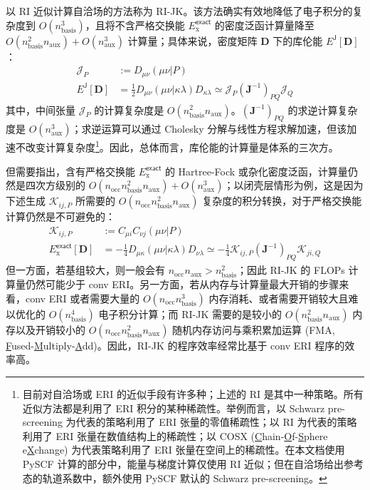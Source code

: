 以 RI 近似计算自洽场的方法称为 RI-JK。该方法确实有效地降低了电子积分的复杂度到 $O(n_\mathrm{basis}^3)$，且将不含严格交换能 $E_\mathrm{x}^\textsf{exact}$ 的密度泛函计算量降至 $O(n_\mathrm{basis}^2 n_\mathrm{aux}) + O(n_\mathrm{aux}^3)$ 计算量；具体来说，密度矩阵 $\mathbf{D}$ 下的库伦能 $E^\textsf{J} [\mathbf{D}]$：
\begin{align*}
  \mathcal{J}_P &:= D_{\mu \nu} (\mu \nu | P) \\
  E^\textsf{J} [\mathbf{D}] &= \frac{1}{2} D_{\mu \nu} (\mu \nu | \kappa \lambda) D_{\kappa \lambda} \simeq \mathcal{J}_P (\mathbf{J}^{-1})_{PQ} \mathcal{J}_Q
\end{align*}
其中，中间张量 $\mathcal{J}_P$ 的计算复杂度是 $O(n_\mathrm{basis}^2 n_\mathrm{aux})$。$(\mathbf{J}^{-1})_{PQ}$ 的求逆计算复杂度是 $O(n_\mathrm{aux}^3)$；求逆运算可以通过 Cholesky 分解与线性方程求解加速，但该加速不改变计算复杂度\footnote{目前对自洽场或 ERI 的近似手段有许多种；上述的 RI 是其中一种策略。所有近似方法都是利用了 ERI 积分的某种稀疏性。举例而言，以 Schwarz pre-screening 为代表的策略利用了 ERI 张量的零值稀疏性\cite{Horn-Ahlrichs.JCC.1991}；以 RI 为代表的策略利用了 ERI 张量在数值结构上的稀疏性\cite{Vahtras-Feyereisen.CPL.1993}；以 COSX (\underline{C}hain-\underline{O}f-\underline{S}phere e\underline{X}change) 为代表策略利用了 ERI 张量在空间上的稀疏性\cite{Neese-Becker.CP.2009}。在本文档使用 PySCF 计算的部分中，能量与梯度计算仅使用 RI 近似；但在自洽场给出参考态的轨道系数中，额外使用 PySCF 默认的 Schwarz pre-screening。}。因此，总体而言，库伦能的计算量是体系的三次方。

但需要指出，含有严格交换能 $E_\mathrm{x}^\textsf{exact}$ 的 Hartree-Fock 或杂化密度泛函，计算量仍然是四次方级别的 $O(n_\mathrm{occ} n_\mathrm{basis}^2 n_\mathrm{aux}) + O(n_\mathrm{aux}^3)$；以闭壳层情形为例，这是因为下述生成 $\mathcal{K}_{ij, P}$ 所需要的 $O(n_\mathrm{occ} n_\mathrm{basis}^2 n_\mathrm{aux})$ 复杂度的积分转换，对于严格交换能计算仍然是不可避免的：
\begin{align*}
  \mathcal{K}_{ij, P} &:= C_{\mu i} C_{\nu j} (\mu \nu | P) \\
  E_\mathrm{x}^\textsf{exact} [\mathbf{D}] &= - \frac{1}{4} D_{\mu \kappa} (\mu \nu | \kappa \lambda) D_{\nu \lambda} \simeq - \frac{1}{4} \mathcal{K}_{ij, P} (\mathbf{J}^{-1})_{PQ} \mathcal{K}_{ji, Q}
\end{align*}
但一方面，若基组较大，则一般会有 $n_\mathrm{occ} n_\mathrm{aux} > n_\mathrm{basis}^2$；因此 RI-JK 的 FLOPs 计算量仍然可能少于 conv ERI。另一方面，若从内存与计算量最大开销的步骤来看，conv ERI 或者需要大量的 $O(n_\mathrm{occ} n_\mathrm{basis}^3)$ 内存消耗、或者需要开销较大且难以优化的 $O(n_\mathrm{basis}^4)$ 电子积分计算；而 RI-JK 需要的是较小的 $O(n_\mathrm{basis}^2 n_\mathrm{aux})$ 内存以及开销较小的 $O(n_\mathrm{occ} n_\mathrm{basis}^2 n_\mathrm{aux})$ 随机内存访问与乘积累加运算 (FMA, \underline{F}used-\underline{M}ultiply-\underline{A}dd)。因此，RI-JK 的程序效率经常比基于 conv ERI 程序的效率高。

